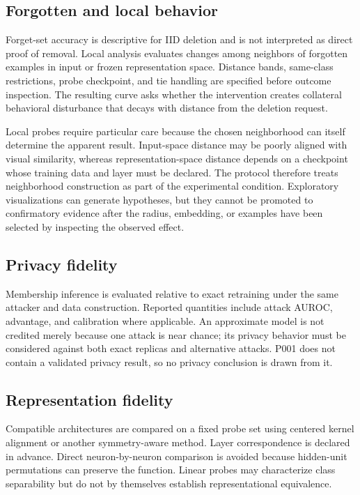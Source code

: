 \subsection{Forgotten and local behavior}
Forget-set accuracy is descriptive for IID deletion and is not interpreted as direct proof
of removal.  Local analysis evaluates changes among neighbors of forgotten examples in
input or frozen representation space.  Distance bands, same-class restrictions, probe
checkpoint, and tie handling are specified before outcome inspection.  The resulting
curve asks whether the intervention creates collateral behavioral disturbance that decays
with distance from the deletion request.

Local probes require particular care because the chosen neighborhood can itself determine
the apparent result. Input-space distance may be poorly aligned with visual similarity,
whereas representation-space distance depends on a checkpoint whose training data and
layer must be declared. The protocol therefore treats neighborhood construction as part of
the experimental condition. Exploratory visualizations can generate hypotheses, but they
cannot be promoted to confirmatory evidence after the radius, embedding, or examples have
been selected by inspecting the observed effect.

\subsection{Privacy fidelity}
Membership inference is evaluated relative to exact retraining under the same attacker and
data construction.  Reported quantities include attack AUROC, advantage, and calibration
where applicable.  An approximate model is not credited merely because one attack is near
chance; its privacy behavior must be considered against both exact replicas and alternative
attacks.  P001 does not contain a validated privacy result, so no privacy conclusion is
drawn from it.

\subsection{Representation fidelity}
Compatible architectures are compared on a fixed probe set using centered kernel alignment
or another symmetry-aware method.  Layer correspondence is declared in advance.  Direct
neuron-by-neuron comparison is avoided because hidden-unit permutations can preserve the
function.  Linear probes may characterize class separability but do not by themselves
establish representational equivalence.

